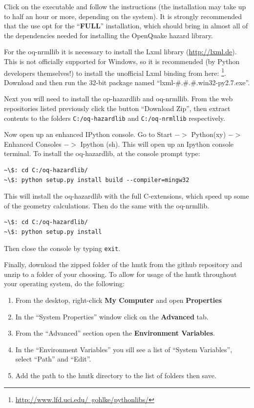 Click on the executable and follow the instructions (the installation may take up to half an hour or more, depending on the system). It is strongly recommended that the use opt for the ``\textbf{FULL}'' installation, which should bring in almost all of the dependencies needed for installing the OpenQuake hazard library. 

For the oq-nrmllib it is necessary to install the Lxml library (\href{http://lxml.de}{http://lxml.de}). This is not officially supported for Windows, so it is recommended (by Python developers themselves!) to install the unofficial Lxml binding from here: \footnote{\href{http://www.lfd.uci.edu/~gohlke/pythonlibs/}{http://www.lfd.uci.edu/~gohlke/pythonlibs/}}. Download and then run the 32-bit package named ``lxml-\#.\#.\#.win32-py2.7.exe''.

Next you will need to install the op-hazardlib and oq-nrmllib. From the web repositories listed previously click the button ``Download Zip'', then extract contents to the folders \verb=C:/oq-hazardlib= and \verb=C:/oq-nrmllib= respectively.

Now open up an enhanced IPython console. Go to Start $->$ Python(xy) $->$ Enhanced Consoles $->$ Ipython (sh). This will open up an Ipython console terminal. To install the oq-hazardlib, at the console prompt type:

\begin{Verbatim}[frame=single, commandchars=\\\{\}, fontsize=\scriptsize]
~\$: cd C:/oq-hazardlib/
~\$: python setup.py install build --compiler=mingw32
\end{Verbatim}

This will install the oq-hazardlib with the full C-extensions, which speed up some of the geometry calculations. Then do the same with the oq-nrmllib.

\begin{Verbatim}[frame=single, commandchars=\\\{\}, fontsize=\scriptsize]
~\$: cd C:/oq-hazardlib/
~\$: python setup.py install
\end{Verbatim}

Then close the console by typing \verb=exit=. 

Finally, download the zipped folder of the hmtk from the github repository and unzip to a folder of your choosing. To allow for usage of the hmtk throughout your operating system, do the following: 

\begin{enumerate}
\item From the desktop, right-click \textbf{My Computer} and open \textbf{Properties}
\item In the ``System Properties'' window click on the \textbf{Advanced} tab.
\item From the ``Advanced'' section open the \textbf{Environment Variables}.
\item In the ``Environment Variables'' you sill see a list of ``System Variables'', select ``Path'' and ``Edit''.
\item Add the path to the hmtk directory to the list of folders then save.
\end{enumerate}

